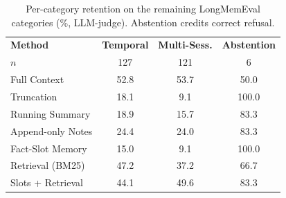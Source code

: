 \documentclass[conference]{IEEEtran}
\begin{document}
\begin{table}[h]
\centering
\caption{Per-category retention on the remaining LongMemEval categories (\%, LLM-judge). Abstention credits correct refusal.}
\label{tab:lme_remaining_cat}
\small
\setlength{\tabcolsep}{4pt}
\begin{tabular}{lccc}
\toprule
\textbf{Method} & \textbf{Temporal} & \textbf{Multi-Sess.} & \textbf{Abstention} \\
$n$ & 127 & 121 & 6 \\
\midrule
Full Context & 52.8 & 53.7 & 50.0 \\
Truncation & 18.1 & 9.1 & 100.0 \\
Running Summary & 18.9 & 15.7 & 83.3 \\
Append-only Notes & 24.4 & 24.0 & 83.3 \\
Fact-Slot Memory & 15.0 & 9.1 & 100.0 \\
Retrieval (BM25) & 47.2 & 37.2 & 66.7 \\
Slots + Retrieval & 44.1 & 49.6 & 83.3 \\
\bottomrule
\end{tabular}
\end{table}
\end{document}
